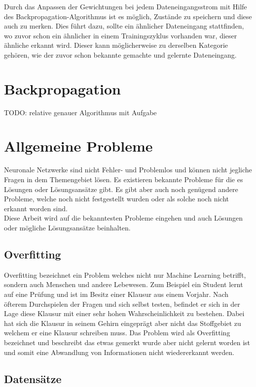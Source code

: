 Durch das Anpassen der Gewichtungen bei jedem Dateneingangsstrom mit Hilfe des Backpropagation-Algorithmus ist es möglich, Zustände zu speichern und diese auch zu merken. 
Dies führt dazu, sollte ein ähnlicher Dateneingang stattfinden, wo zuvor schon ein ähnlicher in einem Trainingszyklus vorhanden war, dieser ähnliche erkannt wird. 
Dieser kann möglicherweise zu derselben Kategorie gehören, wie der zuvor schon bekannte gemachte und gelernte Dateneingang.

\section{Backpropagation}

TODO: relative genauer Algorithmus mit Aufgabe

\section{Allgemeine Probleme}

Neuronale Netzwerke sind nicht Fehler- und Problemlos und können nicht jegliche Fragen in dem Themengebiet lösen. 
Es existieren bekannte Probleme für die es Lösungen oder Lösungsansätze gibt. 
Es gibt aber auch noch genügend andere Probleme, welche noch nicht festgestellt wurden oder als solche noch nicht erkannt worden sind. \\

Diese Arbeit wird auf die bekanntesten Probleme eingehen und auch Lösungen oder mögliche Lösungsansätze beinhalten. 

\subsection{Overfitting}

Overfitting bezeichnet ein Problem welches nicht nur Machine Learning betrifft, sondern auch Menschen und andere Lebewesen. 
Zum Beispiel ein Student lernt auf eine Prüfung und ist im Besitz einer Klausur aus einem Vorjahr. 
Nach öfterem Durchspielen der Fragen und sich selbst testen, befindet er sich in der Lage diese Klausur mit einer sehr hohen Wahrscheinlichkeit zu bestehen. 
Dabei hat sich die Klausur in seinem Gehirn eingeprägt aber nicht das Stoffgebiet zu welchem er eine Klausur schreiben muss. 
Das Problem wird als Overfitting bezeichnet und beschreibt das etwas gemerkt wurde aber nicht gelernt worden ist und somit eine Abwandlung von Informationen nicht wiedererkannt werden.

\subsection{Datensätze}

